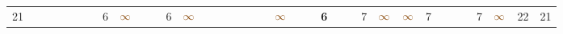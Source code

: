 \begin{landscape}
\begin{table}
\begin{adjustwidth}{-2.6cm}{}
{\begin{tabular}{l|lllllllllllllllllllllllllllllllll|ll}
		21   &            &                                                                 &                                                                 &                                                                 &                                                                 &                                                                 & 6                                                               & $\textcolor[rgb]{0.541,0.29,0.043}{\infty}$ &                                                                 &                                                                 & 6                                                               & $\textcolor[rgb]{0.541,0.29,0.043}{\infty}$ &                                                                 &                                                                 &                                                                 &                                                                 &                                                                 &                                                                 & $\textcolor[rgb]{0.541,0.29,0.043}{\infty}$ &                                                                 &                                                                 & \textbf{6}                                                      &                                                                 &                                                                 & 7                                                               & $\textcolor[rgb]{0.541,0.29,0.043}{\infty}$ & $\textcolor[rgb]{0.541,0.29,0.043}{\infty}$ & 7                                                               &                                                                 &                                                                 &                                                                 & 7                                                               & $\textcolor[rgb]{0.541,0.29,0.043}{\infty}$ & 22         & 21          \\

\end{tabular}}
\end{adjustwidth}
\end{table}
\end{landscape}
